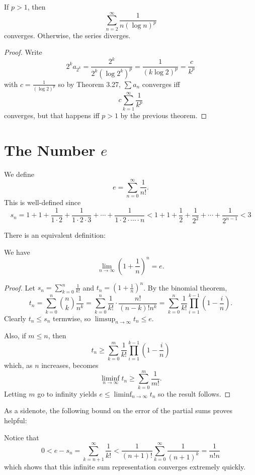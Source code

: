 \begin{theorem} %
If $p > 1$, then
\[
	\sum_{n=2}^{\infty} \frac{1}{n (\log n)^p}
\]
converges. Otherwise, the series diverges.

\begin{proof}
Write
\[
	2^k a_{2^k} = \frac{2^k}{2^k (\log 2^k)^p} = \frac{1}{(k \log 2)^p} = \frac{c}{k^p}
\]
with $c = \frac{1}{(\log 2)^p}$ so by Theorem 3.27, $\sum a_n$ converges iff
\[
	c \sum_{k=1}^{\infty} \frac{1}{k^p}
\]
converges, but that happens iff $p > 1$ by the previous theorem.
\end{proof}
\end{theorem}

\section{The Number $e$}

\begin{definition}
We define
\[
	e = \sum_{n=0}^{\infty} \frac{1}{n!}.
\]
This is well-defined since
\[
	s_n = 1 + 1 + \frac{1}{1 \cdot 2} + \frac{1}{1 \cdot 2 \cdot 3} + \dotsb + \frac{1}{1 \cdot 2 \cdot \dotsb \cdot n} < 1 + 1 + \frac{1}{2} + \frac{1}{2^2} + \dotsb + \frac{1}{2^{n-1}} < 3
\]
\end{definition}

There is an equivalent definition:
\begin{theorem} %
We have
\[
	\lim_{n \to \infty} \left(1 + \frac{1}{n}\right)^n = e.
\]

\begin{proof}
Let $s_n = \sum_{k=0}^{n} \frac{1}{k!}$ and $t_n = \left(1 + \frac{1}{n}\right)^n$. By the binomial theorem,
\[
	t_n = \sum_{k=0}^{n} \binom{n}{k} \frac{1}{n^k} = \sum_{k=0}^{n} \frac{1}{k!} \cdot \frac{n!}{(n-k)! n^k} = \sum_{k=0}^{n} \frac{1}{k!} \prod_{i=1}^{k-1} \left(1 - \frac{i}{n}\right).
\]
Clearly $t_n \le s_n$ termwise, so $\limsup_{n \to \infty} t_n \le e$.

Also, if $m \le n$, then
\[
	t_n \ge \sum_{k=0}^{m} \frac{1}{k!} \prod_{i=1}^{k-1} \left(1 - \frac{i}{n}\right)
\]
which, as $n$ increases, becomes
\[
	\liminf_{n \to \infty} t_n \ge \sum_{k=0}^{m} \frac{1}{m!}.
\]
Letting $m$ go to infinity yields $e \le \liminf_{n \to \infty} t_n$ so the result follows.
\end{proof}
\end{theorem}

As a sidenote, the following bound on the error of the partial sums proves helpful:
\begin{remark}
Notice that
\[
	0 < e - s_n = \sum_{k=n+1}^{\infty} \frac{1}{k!} < \frac{1}{(n + 1)!} \sum_{k=0}^{\infty} \frac{1}{(n + 1)^k} = \frac{1}{n!n}
\]
which shows that this infinite sum representation converges extremely quickly.
\end{remark}

